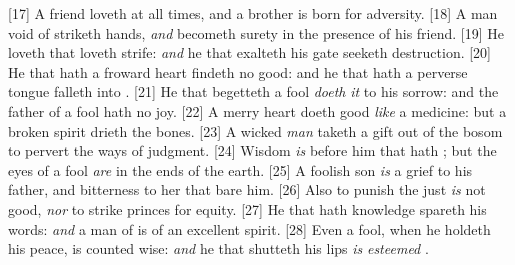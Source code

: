 [17] \textcolor[cmyk]{0.99998,1,0,0}{A friend loveth at all times, and a brother is born for adversity.}
[18] \textcolor[cmyk]{0.99998,1,0,0}{A man void of  striketh hands, \emph{and} becometh surety in the presence of his friend.}
[19] \textcolor[cmyk]{0.99998,1,0,0}{He loveth  that loveth strife: \emph{and} he that exalteth his gate seeketh destruction.}
[20] \textcolor[cmyk]{0.99998,1,0,0}{He that hath a froward heart findeth no good: and he that hath a perverse tongue falleth into .}
[21] \textcolor[cmyk]{0.99998,1,0,0}{He that begetteth a fool \emph{doeth} \emph{it} to his sorrow: and the father of a fool hath no joy.}
[22] \textcolor[cmyk]{0.99998,1,0,0}{A merry heart doeth good \emph{like} a medicine: but a broken spirit drieth the bones.}
[23] \textcolor[cmyk]{0.99998,1,0,0}{A wicked \emph{man} taketh a gift out of the bosom to pervert the ways of judgment.}
[24] \textcolor[cmyk]{0.99998,1,0,0}{Wisdom \emph{is} before him that hath ; but the eyes of a fool \emph{are} in the ends of the earth.}
[25] \textcolor[cmyk]{0.99998,1,0,0}{A foolish son \emph{is} a grief to his father, and bitterness to her that bare him.}
[26] \textcolor[cmyk]{0.99998,1,0,0}{Also to punish the just \emph{is} not good, \emph{nor} to strike princes for equity.}
[27] \textcolor[cmyk]{0.99998,1,0,0}{He that hath knowledge spareth his words: \emph{and} a man of  is of an excellent spirit.}
[28] \textcolor[cmyk]{0.99998,1,0,0}{Even a fool, when he holdeth his peace, is counted wise: \emph{and} he that shutteth his lips \emph{is} \emph{esteemed} .}


